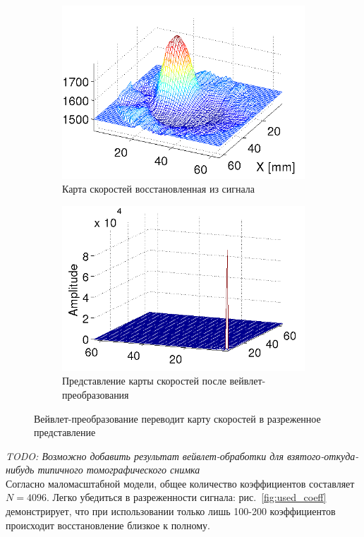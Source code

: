 \documentclass[14pt]{matmex-diploma}
\begin{document}
\begin{figure}[h]

\begin{subfigure}{.5\textwidth}
    \centering
    \includegraphics[width=0.8\linewidth]{pics/speed_map.png}
    \caption{Карта скоростей восстановленная из сигнала}
    \label{fig:speedmap}
\end{subfigure}
\begin{subfigure}{.5\textwidth}
    \centering
    \includegraphics[width=0.8\linewidth]{pics/freq_domain.png}
    \caption{Представление карты скоростей после вейвлет-преобразования}
    \label{fig:waveletted}
\end{subfigure}
	\caption{Вейвлет-преобразование переводит карту скоростей в разреженное представление}
	\label{fig:wavelet_transform}
\end{figure}

\textit{TODO: Возможно добавить результат вейвлет-обработки для взятого-откуда-нибудь типичного томографического снимка} \\

Согласно маломасштабной модели, общее количество коэффициентов составляет $N = 4096$.  Легко убедиться в разреженности сигнала: рис.~\ref{fig:used_coeff} демонстрирует, что при использовании только лишь 100-200 коэффициентов происходит восстановление близкое к полному. \\
\end{document}
